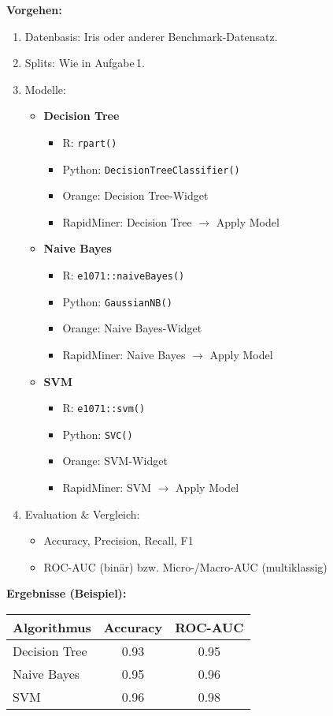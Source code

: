 \documentclass[a4paper,12pt]{article}
\begin{document}
\textbf{Vorgehen:}
\begin{enumerate}
  \item Datenbasis: Iris oder anderer Benchmark-Datensatz.
  \item Splits: Wie in Aufgabe\,1.
  \item Modelle:
    \begin{itemize}
      \item \textbf{Decision Tree}
      \begin{itemize}
        \item R: \lstinline|rpart()|
        \item Python: \lstinline|DecisionTreeClassifier()|
        \item Orange: Decision Tree-Widget
        \item RapidMiner: Decision Tree $\to$ Apply Model
      \end{itemize}
      \item \textbf{Naive Bayes}
      \begin{itemize}
        \item R: \lstinline|e1071::naiveBayes()|
        \item Python: \lstinline|GaussianNB()|
        \item Orange: Naive Bayes-Widget
        \item RapidMiner: Naive Bayes $\to$ Apply Model
      \end{itemize}
      \item \textbf{SVM}
      \begin{itemize}
        \item R: \lstinline|e1071::svm()|
        \item Python: \lstinline|SVC()|
        \item Orange: SVM-Widget
        \item RapidMiner: SVM $\to$ Apply Model
      \end{itemize}
    \end{itemize}
  \item Evaluation \& Vergleich:
    \begin{itemize}
      \item Accuracy, Precision, Recall, F1
      \item ROC-AUC (binär) bzw. Micro-/Macro-AUC (multiklassig)
    \end{itemize}
\end{enumerate}

\textbf{Ergebnisse (Beispiel):}
\begin{center}
\begin{tabular}{lcc}
\hline
Algorithmus & Accuracy & ROC-AUC \\
\hline
Decision Tree & 0.93 & 0.95 \\
Naive Bayes & 0.95 & 0.96 \\
SVM & 0.96 & 0.98 \\
\hline
\end{tabular}
\end{center}
\end{document}
